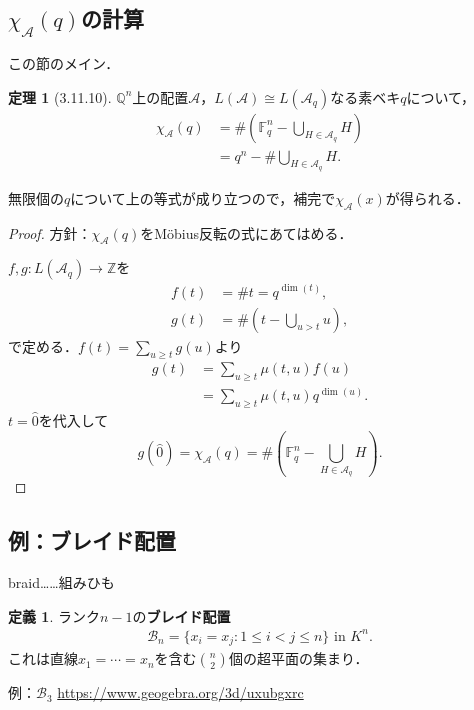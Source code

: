 \documentclass[xelatex,ja=standard,a4paper,14pt,everyparhook=compat]{bxjsarticle}
\newcommand{\bbQ}{\mathbb{Q}}
\newcommand{\bbZ}{\mathbb{Z}}
\newcommand{\bbF}{\mathbb{F}}
\newcommand{\mcA}{\mathcal{A}}
\newcommand{\mcB}{\mathcal{B}}
\theoremstyle{definition}
\newtheorem*{theorem}{定理}
\newtheorem*{definition}{定義}
\begin{document}
\subsection{$\chi_\mcA(q)$の計算}

この節のメイン．

\begin{theorem}[3.11.10]
    $\bbQ^n$上の配置$\mcA$，$L(\mcA) \cong L(\mcA_q)$なる素ベキ$q$について， \begin{align*}
        \chi_\mcA(q) & = \#\left(\bbF_q^n - \bigcup_{H \in \mcA_q} H\right) \\
                     & = q^n - \#\bigcup_{H \in \mcA_q} H.
    \end{align*}
\end{theorem}
無限個の$q$について上の等式が成り立つので，補完で$\chi_\mcA(x)$が得られる．
\begin{proof}
    方針：$\chi_\mcA(q)$をM\"obius反転の式にあてはめる．

    $f,g : L(\mcA_q) \to \bbZ$を \begin{align*}
        f(t) & = \#t = q^{\dim(t)},                    \\
        g(t) & = \#\left(t - \bigcup_{u > t} u\right),
    \end{align*}
    で定める．$f(t) = \sum_{u \geq t} g(u)$より \begin{align*}
        g(t) & = \sum_{u \geq t} \mu(t,u) f(u)         \\
             & = \sum_{u \geq t} \mu(t,u) q^{\dim(u)}.
    \end{align*}
    $t = \hat0$を代入して \begin{equation*}
        g(\hat0) = \chi_\mcA(q) = \#\left(\bbF_q^n - \bigcup_{H \in \mcA_q} H\right).
    \end{equation*}
\end{proof}

\subsection{例：ブレイド配置}
braid……組みひも

\begin{definition}
    ランク$n-1$の\textbf{ブレイド配置} \begin{align*}
        \mcB_n = \{x_i = x_j : 1 \leq i < j \leq n\} \text{ in $K^n$}.
    \end{align*}
    これは直線$x_1=\cdots=x_n$を含む$\binom{n}{2}$個の超平面の集まり．
\end{definition}
例：$\mcB_3$ \url{https://www.geogebra.org/3d/uxubgxrc}
\end{document}
